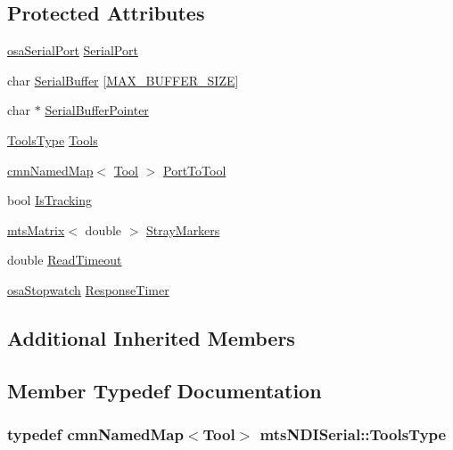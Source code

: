 \subsection*{Protected Attributes}
\begin{DoxyCompactItemize}
\item 
\hyperlink{classosa_serial_port}{osa\-Serial\-Port} \hyperlink{classmts_n_d_i_serial_a76b386e7f977b85ee1e48f7126063aa7}{Serial\-Port}
\item 
char \hyperlink{classmts_n_d_i_serial_ae5b23b322f963e10ebcc04902864eebf}{Serial\-Buffer} \mbox{[}\hyperlink{classmts_n_d_i_serial_a4f3a40ab6fd5a3262110e46f1b5ce1aba5a2ba9c836a108b8648fa0887336f5cd}{M\-A\-X\-\_\-\-B\-U\-F\-F\-E\-R\-\_\-\-S\-I\-Z\-E}\mbox{]}
\item 
char $\ast$ \hyperlink{classmts_n_d_i_serial_a7017ac2bda0bd5a4aa0d8dc8e4aaf2f8}{Serial\-Buffer\-Pointer}
\item 
\hyperlink{classmts_n_d_i_serial_aa7927ca6826aae84f89df0ca800fe6bd}{Tools\-Type} \hyperlink{classmts_n_d_i_serial_adae8811079b92709d39a1818eba867c1}{Tools}
\item 
\hyperlink{classcmn_named_map}{cmn\-Named\-Map}$<$ \hyperlink{classmts_n_d_i_serial_1_1_tool}{Tool} $>$ \hyperlink{classmts_n_d_i_serial_a9e780c436ba6d57152ef11c722771034}{Port\-To\-Tool}
\item 
bool \hyperlink{classmts_n_d_i_serial_a9908b1079e158ad8d708d5ff00bd953f}{Is\-Tracking}
\item 
\hyperlink{classmts_matrix}{mts\-Matrix}$<$ double $>$ \hyperlink{classmts_n_d_i_serial_a061167330c608d025a0d6a6c9782b552}{Stray\-Markers}
\item 
double \hyperlink{classmts_n_d_i_serial_a09bb13f36457efa0528f4ca880ce1891}{Read\-Timeout}
\item 
\hyperlink{classosa_stopwatch}{osa\-Stopwatch} \hyperlink{classmts_n_d_i_serial_a78f53a7d4b1caa4fca9ee1a835ed16be}{Response\-Timer}
\end{DoxyCompactItemize}
\subsection*{Additional Inherited Members}


\subsection{Member Typedef Documentation}
\hypertarget{classmts_n_d_i_serial_aa7927ca6826aae84f89df0ca800fe6bd}{
\subsubsection[{Tools\-Type}]{\setlength{\rightskip}{0pt plus 5cm}typedef {\bf cmn\-Named\-Map}$<${\bf Tool}$>$ {\bf mts\-N\-D\-I\-Serial\-::\-Tools\-Type}\hspace{0.3cm}{\ttfamily [protected]}}}\label{classmts_n_d_i_serial_aa7927ca6826aae84f89df0ca800fe6bd}


